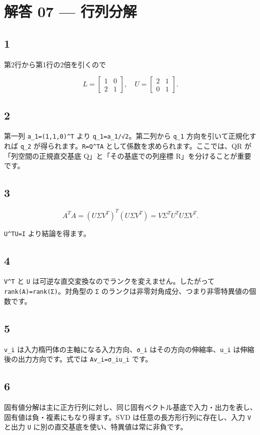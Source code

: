 \documentclass[
  11pt,
  a4paper,
]{ltjsarticle}
\author{}
\date{}
\begin{document}
\hypertarget{ux89e3ux7b54-07-ux884cux5217ux5206ux89e3}{%
\section{解答 07 ---
行列分解}\label{ux89e3ux7b54-07-ux884cux5217ux5206ux89e3}}

\hypertarget{section}{%
\subsection{1}\label{section}}

第2行から第1行の2倍を引くので

\[
L=\begin{bmatrix}1&0\\2&1\end{bmatrix},\quad
U=\begin{bmatrix}2&1\\0&1\end{bmatrix}.
\]

\hypertarget{section-1}{%
\subsection{2}\label{section-1}}

第一列 \texttt{a\_1=(1,1,0)\^{}T} より \texttt{q\_1=a\_1/√2}。第二列から
\texttt{q\_1} 方向を引いて正規化すれば \texttt{q\_2}
が得られます。\texttt{R=Q\^{}TA} として係数を求められます。ここでは、QR
が「列空間の正規直交基底 Q」と「その基底での列座標
R」を分けることが重要です。

\hypertarget{section-2}{%
\subsection{3}\label{section-2}}

\[
A^TA=(UΣV^T)^T(UΣV^T)=VΣ^TU^TUΣV^T.
\]

\texttt{U\^{}TU=I} より結論を得ます。

\hypertarget{section-3}{%
\subsection{4}\label{section-3}}

\texttt{V\^{}T} と \texttt{U}
は可逆な直交変換なのでランクを変えません。したがって
\texttt{rank(A)=rank(Σ)}。対角型の \texttt{Σ}
のランクは非零対角成分、つまり非零特異値の個数です。

\hypertarget{section-4}{%
\subsection{5}\label{section-4}}

\texttt{v\_i} は入力楕円体の主軸になる入力方向、\texttt{σ\_i}
はその方向の伸縮率、\texttt{u\_i} は伸縮後の出力方向です。式では
\texttt{Av\_i=σ\_iu\_i} です。

\hypertarget{section-5}{%
\subsection{6}\label{section-5}}

固有値分解は主に正方行列に対し、同じ固有ベクトル基底で入力・出力を表し、固有値は負・複素にもなり得ます。SVD
は任意の長方形行列に存在し、入力 \texttt{V} と出力 \texttt{U}
に別の直交基底を使い、特異値は常に非負です。
\end{document}
